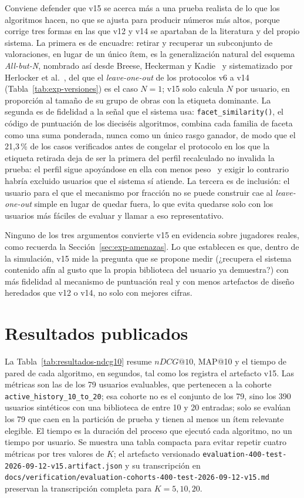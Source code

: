 Conviene defender que v15 se acerca más a una prueba realista de lo que los algoritmos hacen, no que se ajusta para producir números más altos, porque corrige tres formas en las que v12 y v14 se apartaban de la literatura y del propio sistema. La primera es de encuadre: retirar y recuperar un subconjunto de valoraciones, en lugar de un único ítem, es la generalización natural del esquema \emph{All-but-N}, nombrado así desde Breese, Heckerman y Kadie~\cite{breese1998empirical} y sistematizado por Herlocker et al.~\cite{herlocker2004evaluating}, del que el \emph{leave-one-out} de los protocolos v6 a v14 (Tabla~\ref{tab:exp-versiones}) es el caso \(N=1\); v15 solo calcula \(N\) por usuario, en proporción al tamaño de su grupo de obras con la etiqueta dominante. La segunda es de fidelidad a la señal que el sistema usa: \texttt{facet\_similarity()}, el código de puntuación de los dieciséis algoritmos, combina cada familia de faceta como una suma ponderada, nunca como un único rasgo ganador, de modo que el 21{,}3\,\% de los casos verificados antes de congelar el protocolo en los que la etiqueta retirada deja de ser la primera del perfil recalculado no invalida la prueba: el perfil sigue apoyándose en ella con menos peso~\cite{pazzani2007content} y exigir lo contrario habría excluido usuarios que el sistema sí atiende. La tercera es de inclusión: el usuario para el que el mecanismo por fracción no se puede construir cae al \emph{leave-one-out} simple en lugar de quedar fuera, lo que evita quedarse solo con los usuarios más fáciles de evaluar y llamar a eso representativo.

Ninguno de los tres argumentos convierte v15 en evidencia sobre jugadores reales, como recuerda la Sección~\ref{sec:exp-amenazas}. Lo que establecen es que, dentro de la simulación, v15 mide la pregunta que se propone medir (¿recupera el sistema contenido afín al gusto que la propia biblioteca del usuario ya demuestra?) con más fidelidad al mecanismo de puntuación real y con menos artefactos de diseño heredados que v12 o v14, no solo con mejores cifras.

\section{Resultados publicados}\label{sec:exp-resultados}\label{sec:exp-exito}

La Tabla~\ref{tab:resultados-ndcg10} resume \(nDCG@10\), MAP@10 y el tiempo de pared de cada algoritmo, en segundos, tal como los registra el artefacto v15. Las métricas son las de los 79 usuarios evaluables, que pertenecen a la cohorte \texttt{active\_history\_10\_to\_20}; esa cohorte no es el conjunto de los 79, sino los 390 usuarios sintéticos con una biblioteca de entre 10 y 20 entradas; solo se evalúan los 79 que caen en la partición de prueba y tienen al menos un ítem relevante elegible. El tiempo es la duración del proceso que ejecutó cada algoritmo, no un tiempo por usuario. Se muestra una tabla compacta para evitar repetir cuatro métricas por tres valores de \(K\); el artefacto versionado \texttt{evaluation-400-test-2026-09-12-v15.artifact.json} y su transcripción en \texttt{docs/verification/evaluation-cohorts-400-test-2026-09-12-v15.md} preservan la transcripción completa para \(K=5,10,20\).

